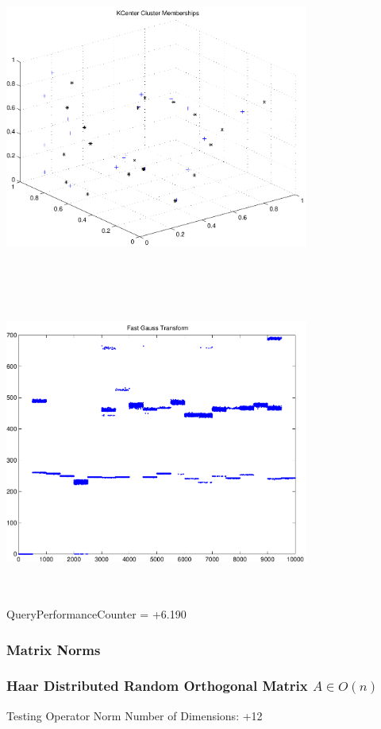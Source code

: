 \documentclass[9pt]{article}
\theoremstyle{plain}
\theoremstyle{definition}
\theoremstyle{remark}
\numberwithin{equation}{section}
\begin{document}
\includegraphics[width=10.0cm,height=10.0cm]{KCenterClusterMemberships_20_Centers.pdf}

\includegraphics[width=10.0cm,height=10.0cm]{FGT20_Centers.pdf}

QueryPerformanceCounter  =  +6.190
\subsubsection{Matrix Norms}
\subsubsection{Haar Distributed Random Orthogonal Matrix $A \in O(n)$}
 Testing Operator Norm
Number of Dimensions: +12
\end{document}

